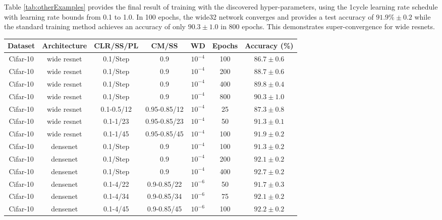 \documentclass{article} %
\begin{document}
Table \ref{tab:otherExamples} provides the final result of training with the discovered hyper-parameters, using the 1cycle learning rate schedule with learning rate bounds from 0.1 to 1.0.  In 100 epochs, the wide32 network converges and provides a test accuracy of $91.9\% \pm 0.2$ while the standard training method achieves an accuracy of only $ 90.3 \pm 1.0 $ in 800 epochs.  This demonstrates super-convergence for wide resnets.

\begin{table}[tb]
	\begin{center}
		\begin{tabular}{| c | c | c | c | c | c | c | }
			\hline
			Dataset & Architecture & CLR/SS/PL  & CM/SS & WD & Epochs & Accuracy (\%) \\ \hline
			Cifar-10 & wide resnet & 0.1/Step  & 0.9  & $10^{-4}$  &  100 & $ 86.7 \pm 0.6 $   \\ \hline
			Cifar-10 & wide resnet & 0.1/Step  & 0.9  & $10^{-4}$  &  200 & $ 88.7 \pm 0.6 $   \\ \hline
			Cifar-10 & wide resnet & 0.1/Step  & 0.9  & $10^{-4}$  &  400 & $ 89.8 \pm 0.4 $   \\ \hline
			Cifar-10 & wide resnet & 0.1/Step  & 0.9  & $10^{-4}$  &  800 & $ 90.3 \pm 1.0 $   \\ \hline
			Cifar-10 & wide resnet & 0.1-0.5/12  & 0.95-0.85/12 & $10^{-4}$ &  25 & $ 87.3 \pm 0.8 $   \\ \hline
			Cifar-10 & wide resnet & 0.1-1/23  & 0.95-0.85/23 & $10^{-4}$  &   50 & $ 91.3 \pm 0.1 $   \\ \hline
			Cifar-10 & wide resnet & 0.1-1/45  & 0.95-0.85/45 & $10^{-4}$  &  100 & $ 91.9 \pm 0.2 $   \\ \hline
			\hline   
			Cifar-10 & densenet & 0.1/Step  & 0.9 & $10^{-4}$  &  100 & $ 91.3 \pm 0.2 $   \\ \hline
			Cifar-10 & densenet & 0.1/Step  & 0.9 & $10^{-4}$  &  200 & $ 92.1 \pm 0.2 $   \\ \hline
			Cifar-10 & densenet & 0.1/Step  & 0.9 & $10^{-4}$  &  400 & $ 92.7 \pm 0.2 $   \\ \hline
			Cifar-10 & densenet & 0.1-4/22  & 0.9-0.85/22 & $10^{-6}$  &  50 & $ 91.7 \pm 0.3 $   \\ \hline
			Cifar-10 & densenet & 0.1-4/34  & 0.9-0.85/34 & $10^{-6}$  &  75 & $ 92.1 \pm 0.2 $   \\ \hline
			Cifar-10 & densenet & 0.1-4/45  & 0.9-0.85/45 & $10^{-6}$  &  100 & $ 92.2 \pm 0.2 $   \\ \hline

\end{tabular}
\end{center}
\end{table}
\end{document}
